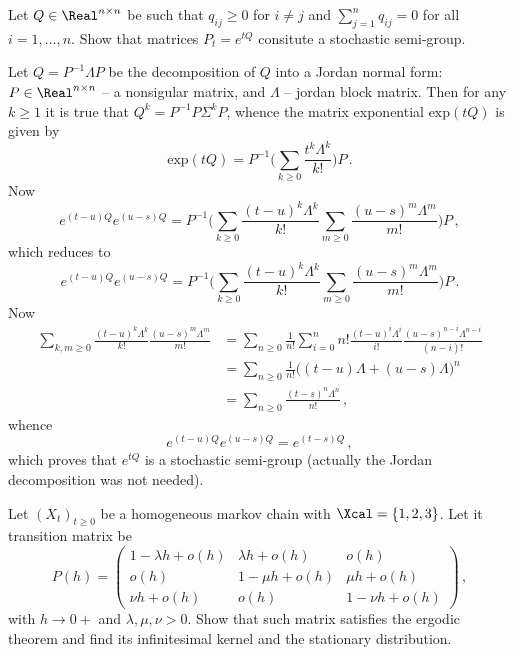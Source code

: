 Let $Q\in\Real^{n\times n}$ be such that $q_{ij}\geq 0$ for $i\neq j$ and
$\sum_{j=1}^n q_{ij} = 0$ for all $i=1,\ldots,n$. Show that matrices $P_t = e^{tQ}$
consitute a stochastic semi-group.

Let $Q = P^{-1} \Lambda P$ be the decomposition of $Q$ into a Jordan normal form:
$P\in \Real^{n\times n}$ -- a nonsigular matrix, and $\Lambda$ -- jordan block matrix.
Then for any $k\geq1$ it is true that $Q^k = P^{-1}P\Sigma^k P$, whence the matrix
exponential $\text{exp}( tQ )$ is given by
\[ \text{exp}(tQ) = P^{-1}\biggl( \sum_{ k\geq0 } \frac{t^k \Lambda^k}{k!} \biggr) P \,. \]
Now
\[ e^{(t-u)Q} e^{(u-s)Q} = 
P^{-1}\biggl( \sum_{ k\geq0 } \frac{(t-u)^k \Lambda^k}{k!}
			  \sum_{ m\geq0 } \frac{(u-s)^m \Lambda^m}{m!} \biggr) P\,, \]
which reduces to
\[ e^{(t-u)Q} e^{(u-s)Q} = 
P^{-1}\biggl( \sum_{ k\geq0 } \frac{(t-u)^k \Lambda^k}{k!}
			  \sum_{ m\geq0 } \frac{(u-s)^m \Lambda^m}{m!} \biggr) P\,. \]
Now
\begin{align*}
	\sum_{ k,m\geq0 } \frac{(t-u)^k \Lambda^k}{k!} \frac{(u-s)^m \Lambda^m}{m!}
		&= \sum_{n\geq0} \frac{1}{n!} \sum_{i=0}^n n!
				\frac{(t-u)^i \Lambda^i}{i!} \frac{(u-s)^{n-i} \Lambda^{n-i}}{(n-i)!} \\
		&= \sum_{n\geq0} \frac{1}{n!}\bigl( (t-u) \Lambda + (u-s) \Lambda \bigr)^n \\
		&= \sum_{n\geq0} \frac{(t-s)^n \Lambda^n}{n!} \,,
\end{align*}
whence
\[ e^{(t-u)Q} e^{(u-s)Q} = e^{(t-s)Q} \,, \]
which proves that $e^{tQ}$ is a stochastic semi-group (actually the Jordan
decomposition was not needed).

Let $(X_t)_{t\geq 0}$ be a homogeneous markov chain with $\Xcal = \{1,2,3\}$. Let
it transition matrix be
\[ P(h) = \begin{pmatrix}
	1-\lambda h+o(h) & \lambda h+o(h) & o(h) \\
	o(h) & 1-\mu h+o(h) & \mu h + o(h) \\
	\nu h+o(h) & o(h) & 1-\nu h+o(h)
\end{pmatrix} \,,\]
with $h\to0+$ and $\lambda,\mu,\nu > 0$. Show that such matrix satisfies the
ergodic theorem and find its infinitesimal kernel and the stationary distribution.

